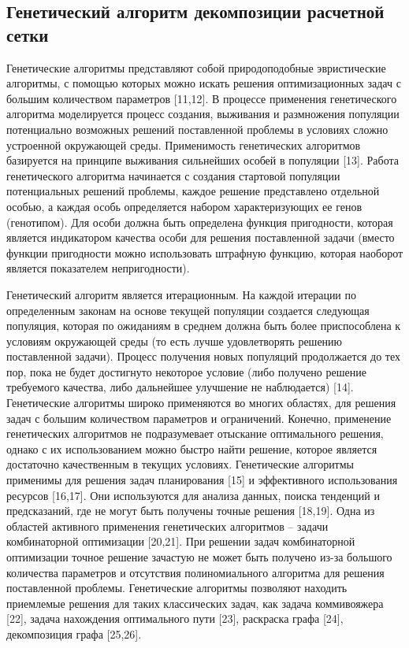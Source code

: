 \subsection{Генетический алгоритм декомпозиции расчетной сетки}

Генетические алгоритмы представляют собой природоподобные эвристические алгоритмы, с помощью которых можно искать решения оптимизационных задач с большим количеством параметров [11,12].
В процессе применения генетического алгоритма моделируется процесс создания, выживания и размножения популяции потенциально возможных решений поставленной проблемы в условиях сложно устроенной окружающей среды.
Применимость генетических алгоритмов базируется на принципе выживания сильнейших особей в популяции [13].
Работа генетического алгоритма начинается с создания стартовой популяции потенциальных решений проблемы, каждое решение представлено отдельной особью, а каждая особь определяется набором характеризующих ее генов (генотипом).
Для особи должна быть определена функция пригодности, которая является индикатором качества особи для решения поставленной задачи (вместо функции пригодности можно использовать штрафную функцию, которая наоборот является показателем непригодности). 

Генетический алгоритм является итерационным.
На каждой итерации по определенным законам на основе текущей популяции создается следующая популяция, которая по ожиданиям в среднем должна быть более приспособлена к условиям окружающей среды (то есть лучше удовлетворять решению поставленной задачи).
Процесс получения новых популяций продолжается до тех пор, пока не будет достигнуто некоторое условие (либо получено решение требуемого качества, либо дальнейшее улучшение не наблюдается) [14].
Генетические алгоритмы широко применяются во многих областях, для решения задач с большим количеством параметров и ограничений.
Конечно, применение генетических алгоритмов не подразумевает отыскание оптимального решения, однако с их использованием можно быстро найти решение, которое является достаточно качественным в текущих условиях.
Генетические алгоритмы применимы для решения задач планирования [15] и эффективного использования ресурсов [16,17].
Они используются для анализа данных, поиска тенденций и предсказаний, где не могут быть получены точные решения [18,19].
Одна из областей активного применения генетических алгоритмов – задачи комбинаторной оптимизации [20,21].
При решении задач комбинаторной оптимизации точное решение зачастую не может быть получено из-за большого количества параметров и отсутствия полиномиального алгоритма для решения поставленной проблемы.
Генетические алгоритмы позволяют находить приемлемые решения для таких классических задач, как задача коммивояжера [22], задача нахождения оптимального пути [23], раскраска графа [24], декомпозиция графа [25,26].

